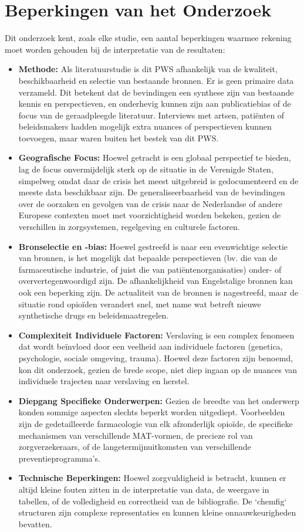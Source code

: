 \documentclass[11pt, a4paper]{report} %
\begin{document}
\section{Beperkingen van het Onderzoek}
Dit onderzoek kent, zoals elke studie, een aantal beperkingen waarmee rekening moet worden gehouden bij de interpretatie van de resultaten:
\begin{itemize}
    \item \textbf{Methode:} Als literatuurstudie is dit PWS afhankelijk van de kwaliteit, beschikbaarheid en selectie van bestaande bronnen. Er is geen primaire data verzameld. Dit betekent dat de bevindingen een synthese zijn van bestaande kennis en perspectieven, en onderhevig kunnen zijn aan publicatiebias of de focus van de geraadpleegde literatuur. Interviews met artsen, patiënten of beleidsmakers hadden mogelijk extra nuances of perspectieven kunnen toevoegen, maar waren buiten het bestek van dit PWS.
    \item \textbf{Geografische Focus:} Hoewel getracht is een globaal perspectief te bieden, lag de focus onvermijdelijk sterk op de situatie in de Verenigde Staten, simpelweg omdat daar de crisis het meest uitgebreid is gedocumenteerd en de meeste data beschikbaar zijn. De generaliseerbaarheid van de bevindingen over de oorzaken en gevolgen van de crisis naar de Nederlandse of andere Europese contexten moet met voorzichtigheid worden bekeken, gezien de verschillen in zorgsystemen, regelgeving en culturele factoren.
    \item \textbf{Bronselectie en -bias:} Hoewel gestreefd is naar een evenwichtige selectie van bronnen, is het mogelijk dat bepaalde perspectieven (bv. die van de farmaceutische industrie, of juist die van patiëntenorganisaties) onder- of oververtegenwoordigd zijn. De afhankelijkheid van Engelstalige bronnen kan ook een beperking zijn. De actualiteit van de bronnen is nagestreefd, maar de situatie rond opioïden verandert snel, met name wat betreft nieuwe synthetische drugs en beleidsmaatregelen.
    \item \textbf{Complexiteit Individuele Factoren:} Verslaving is een complex fenomeen dat wordt beïnvloed door een veelheid aan individuele factoren (genetica, psychologie, sociale omgeving, trauma). Hoewel deze factoren zijn benoemd, kon dit onderzoek, gezien de brede scope, niet diep ingaan op de nuances van individuele trajecten naar verslaving en herstel.
    \item \textbf{Diepgang Specifieke Onderwerpen:} Gezien de breedte van het onderwerp konden sommige aspecten slechts beperkt worden uitgediept. Voorbeelden zijn de gedetailleerde farmacologie van elk afzonderlijk opioïde, de specifieke mechanismen van verschillende MAT-vormen, de precieze rol van zorgverzekeraars, of de langetermijnuitkomsten van verschillende preventieprogramma's.
    \item \textbf{Technische Beperkingen:} Hoewel zorgvuldigheid is betracht, kunnen er altijd kleine fouten zitten in de interpretatie van data, de weergave in tabellen, of de volledigheid en correctheid van de bibliografie. De `chemfig` structuren zijn complexe representaties en kunnen kleine onnauwkeurigheden bevatten.
\end{itemize}
\end{document}
